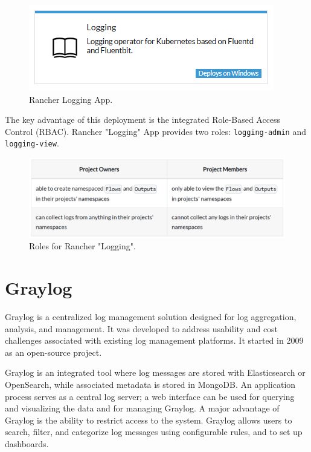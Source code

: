 \documentclass[../main.tex]{subfiles}
\begin{document}
\begin{figure}[H]
        \centering
        \includegraphics[]{img/3-background/centralized_logging/logging_app.png}
        \caption{Rancher Logging App.}
        \label{fig:logging_app}
\end{figure}

The key advantage of this deployment is the integrated Role-Based Access Control (RBAC). Rancher "Logging" App provides two roles: \texttt{logging-admin} and \texttt{logging-view}.

\begin{figure}[H]
        \centering
        \includegraphics[scale=0.7]{img/3-background/rancher_logging_app/roles.png}
        \caption{Roles for Rancher "Logging". \protect\footnotemark}
        \label{fig:roles}
\end{figure}


\section{Graylog}

Graylog is a centralized log management solution designed for log aggregation, analysis, and management. It was developed to address usability and cost challenges associated with existing log management platforms. It started in 2009 as an open-source project.

Graylog is an integrated tool where log messages are stored with Elasticsearch or OpenSearch, while associated metadata is stored in MongoDB. An application process serves as a central log server; a web interface can be used for querying and visualizing the data and for managing Graylog. A major advantage of Graylog is the ability to restrict access to the system. Graylog allows users to search, filter, and categorize log messages using configurable rules, and to set up dashboards. \cite{hopf2016elasticsearch}
\end{document}
